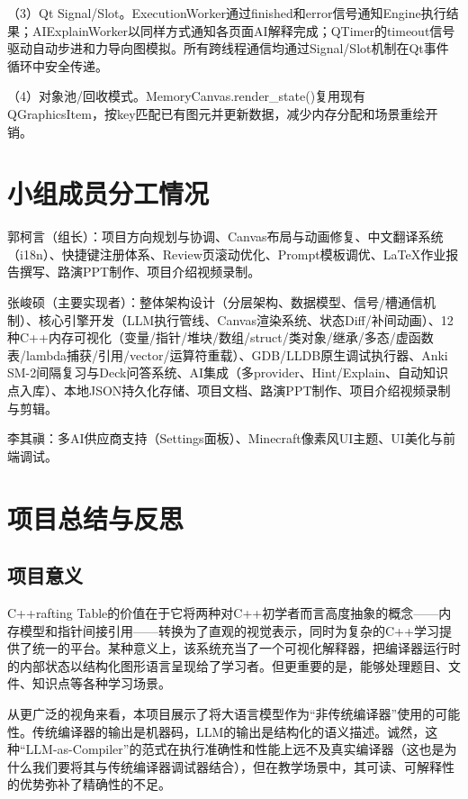 \documentclass[12pt,a4paper]{ctexart}
\begin{document}
（3）Qt Signal/Slot。ExecutionWorker通过finished和error信号通知Engine执行结果；AIExplainWorker以同样方式通知各页面AI解释完成；QTimer的timeout信号驱动自动步进和力导向图模拟。所有跨线程通信均通过Signal/Slot机制在Qt事件循环中安全传递。

（4）对象池/回收模式。MemoryCanvas.render\_state()复用现有QGraphicsItem，按key匹配已有图元并更新数据，减少内存分配和场景重绘开销。

\section{小组成员分工情况}

郭柯言（组长）：项目方向规划与协调、Canvas布局与动画修复、中文翻译系统（i18n）、快捷键注册体系、Review页滚动优化、Prompt模板调优、LaTeX作业报告撰写、路演PPT制作、项目介绍视频录制。

张峻硕（主要实现者）：整体架构设计（分层架构、数据模型、信号/槽通信机制）、核心引擎开发（LLM执行管线、Canvas渲染系统、状态Diff/补间动画）、12种C++内存可视化（变量/指针/堆块/数组/struct/类对象/继承/多态/虚函数表/lambda捕获/引用/vector/运算符重载）、GDB/LLDB原生调试执行器、Anki SM-2间隔复习与Deck问答系统、AI集成（多provider、Hint/Explain、自动知识点入库）、本地JSON持久化存储、项目文档、路演PPT制作、项目介绍视频录制与剪辑。

李其禛：多AI供应商支持（Settings面板）、Minecraft像素风UI主题、UI美化与前端调试。

\section{项目总结与反思}

\subsection{项目意义}

C++rafting Table的价值在于它将两种对C++初学者而言高度抽象的概念——内存模型和指针间接引用——转换为了直观的视觉表示，同时为复杂的C++学习提供了统一的平台。某种意义上，该系统充当了一个可视化解释器，把编译器运行时的内部状态以结构化图形语言呈现给了学习者。但更重要的是，能够处理题目、文件、知识点等各种学习场景。

从更广泛的视角来看，本项目展示了将大语言模型作为“非传统编译器”使用的可能性。传统编译器的输出是机器码，LLM的输出是结构化的语义描述。诚然，这种“LLM-as-Compiler”的范式在执行准确性和性能上远不及真实编译器（这也是为什么我们要将其与传统编译器调试器结合），但在教学场景中，其可读、可解释性的优势弥补了精确性的不足。
\end{document}
